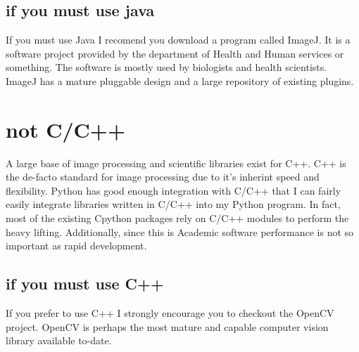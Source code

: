 \subsection{if you must use java}
If you must use Java I recomend you download a program called ImageJ. It is a software project provided by the department of Health and Human services or something.  The software is mostly used by biologists and health scientists. ImageJ has a mature pluggable design and a large repository of existing plugins.

\section{not C/C++}
A large base of image processing and scientific libraries exist for C++. C++ is the de-facto standard for image processing due to it's inherint speed and flexibility. Python has good enough integration with C/C++ that I can fairly easily integrate libraries written in C/C++ into my Python program.  In fact, most of the existing Cpython packages rely on C/C++ modules to perform the heavy lifting.  Additionally, since this is Academic software performance is not so important as rapid development.

\subsection{if you must use C++}
If you prefer to use C++ I strongly encourage you to checkout the OpenCV project. OpenCV is perhaps the most mature and capable computer vision library  available to-date.

\newpage
